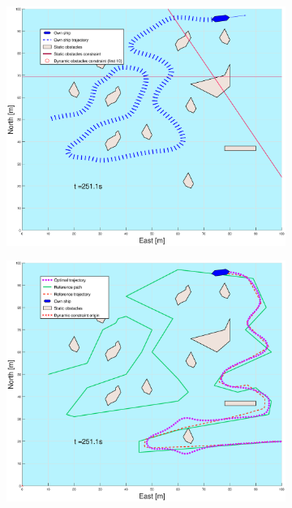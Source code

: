 \begin{figure}[ht]
\begin{subfigure}[b]{0.499\textwidth}
    \end{subfigure}
    \hfill
    \\ 
    \begin{subfigure}[b]{0.49\textwidth}
        \centering
        \includegraphics[width=\textwidth]{Images/Figures/skjergard_u_trafikk/_Simple_1fig1_time=251}
    \end{subfigure}
    \hfill
    \begin{subfigure}[b]{0.499\textwidth}
        \centering
        \includegraphics[width=\textwidth]{Images/Figures/skjergard_u_trafikk/_Simple_1fig999_time=251}
    \end{subfigure}
    \hfill
\end{figure}
